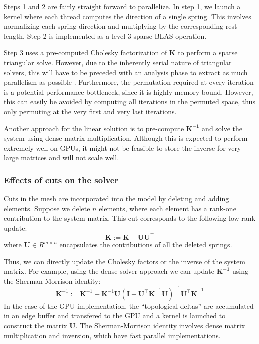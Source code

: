 Steps 1 and 2 are fairly straight forward to parallelize. In step 1, we
launch a kernel where each thread computes the direction of a single spring.
This involves normalizing each spring direction and multiplying by the corresponding
rest-length. Step 2 is implemented as a level 3 sparse BLAS operation.

Step 3 uses a pre-computed Cholesky factorization of
$\mathbf{K}$ to perform a sparse triangular solve. However, due to the inherently
serial nature of triangular solvers, this will have to be preceded with an 
analysis phase to extract as much parallelism as possible \cite{Mayer09}.
Furthermore, the permutation
required at every iteration is a potential performance bottleneck, since it is 
highly memory bound. However, this can easily be avoided by computing all 
iterations in the permuted space, thus only permuting at the very first and 
very last iterations.

Another approach for the linear solution is to pre-compute $\mathbf{K^{-1}}$ and solve the system
using dense matrix multiplication. Although this is expected to perform
extremely well on GPUs, it might not be feasible to store the inverse
for very large matrices and will not scale well. 

\subsubsection{Effects of cuts on the solver}
Cuts in the mesh are incorporated into the model by deleting and adding elements. Suppose we delete
$n$ elements, where each element has a rank-one contribution to the system matrix. 
This cut corresponds to the following low-rank update:
\begin{equation}
  \mathbf{K}:=
  \mathbf{K} - \mathbf{U}\mathbf{U^\intercal}
\end{equation}
where $\mathbf{U} \in R^{m \times n}$ encapsulates the contributions
of all the deleted springs. 

Thus, we can directly update the Cholesky factors or the inverse of the
system matrix. For example, using the dense solver approach we can update
$\mathbf{K^{-1}}$ using the Sherman-Morrison identity:
\begin{equation}
  \mathbf{K}^{-1} :=
  \mathbf{K}^{-1} +
  \mathbf{K}^{-1}\mathbf{U}(\mathbf{I} - \mathbf{U^\intercal K}^{-1}\mathbf{U})^{-1}
  \mathbf{U^\intercal K}^{-1}
\end{equation}
In the case of the GPU implementation, the ``topological deltas'' are accumulated in 
an edge buffer and transfered to the GPU and a kernel is launched to construct
the matrix $\mathbf{U}$. The Sherman-Morrison identity involves dense matrix
multiplication and inversion, which have fast parallel implementations. 


